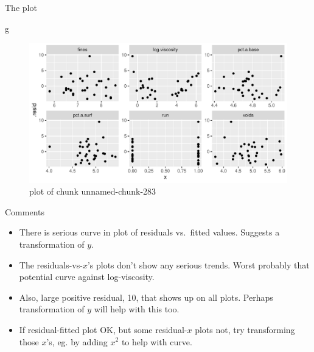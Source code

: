 \documentclass[
  ignorenonframetext,
]{beamer}
\newenvironment{Shaded}{\begin{snugshade}}{\end{snugshade}}
\newcommand{\NormalTok}[1]{#1}
\providecommand{\tightlist}{%
  \setlength{\itemsep}{0pt}\setlength{\parskip}{0pt}}
\begin{document}
\begin{frame}[fragile]{The plot}
\protect\hypertarget{the-plot-3}{}

\begin{Shaded}
\begin{Highlighting}[]
\NormalTok{g}
\end{Highlighting}
\end{Shaded}

\begin{figure}
\centering
\includegraphics{figure/unnamed-chunk-283-1.pdf}
\caption{plot of chunk unnamed-chunk-283}
\end{figure}

\end{frame}

\begin{frame}{Comments}
\protect\hypertarget{comments-20}{}

\begin{itemize}
\tightlist
\item
  There is serious curve in plot of residuals vs.~fitted values.
  Suggests a transformation of \(y\).
\item
  The residuals-vs-\(x\)'s plots don't show any serious trends. Worst
  probably that potential curve against log-viscosity.
\item
  Also, large positive residual, 10, that shows up on all plots. Perhaps
  transformation of \(y\) will help with this too.
\item
  If residual-fitted plot OK, but some residual-\(x\) plots not, try
  transforming those \(x\)'s, eg. by adding \(x^2\) to help with curve.
\end{itemize}

\end{frame}
\end{document}
